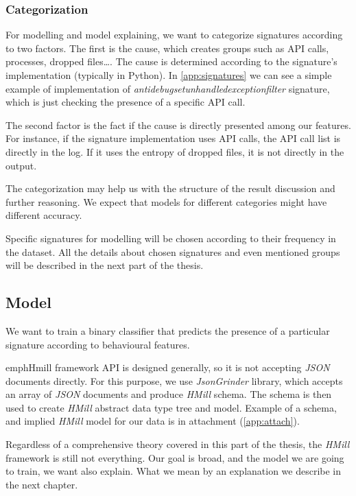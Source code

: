 \subsubsection{Categorization}
For modelling and model explaining, we want to categorize signatures according to two factors. The first is the cause, which creates groups such as API calls, processes, dropped files\dots. The cause is determined according to the signature's implementation (typically in Python). In \ref{app:signatures} we can see a simple example of implementation of \emph{antidebugsetunhandledexceptionfilter} signature, which is just checking the presence of a specific API call.

The second factor is the fact if the cause is directly presented among our features. For instance, if the signature implementation uses API calls, the API call list is directly in the log. If it uses the entropy of dropped files, it is not directly in the output.

The categorization may help us with the structure of the result discussion and further reasoning. We expect that models for different categories might have different accuracy.

Specific signatures for modelling will be chosen according to their frequency in the dataset. All the details about chosen signatures and even mentioned groups will be described in the next part of the thesis.

\subsection{Model}
We want to train a binary classifier that predicts the presence of a particular signature according to behavioural features.

emph{Hmill} framework API is designed generally, so it is not accepting \emph{JSON} documents directly. For this purpose, we use \emph{JsonGrinder} library, which accepts an array of \emph{JSON} documents and produce \emph{HMill} schema. The schema is then used to create \emph{HMill} abstract data type tree and model. Example of a schema, and implied \emph{HMill} model for our data is in attachment (\ref{app:attach}).

Regardless of a comprehensive theory covered in this part of the thesis, the \emph{HMill} framework is still not everything. Our goal is broad, and the model we are going to train, we want also explain. What we mean by an explanation we describe in the next chapter.



